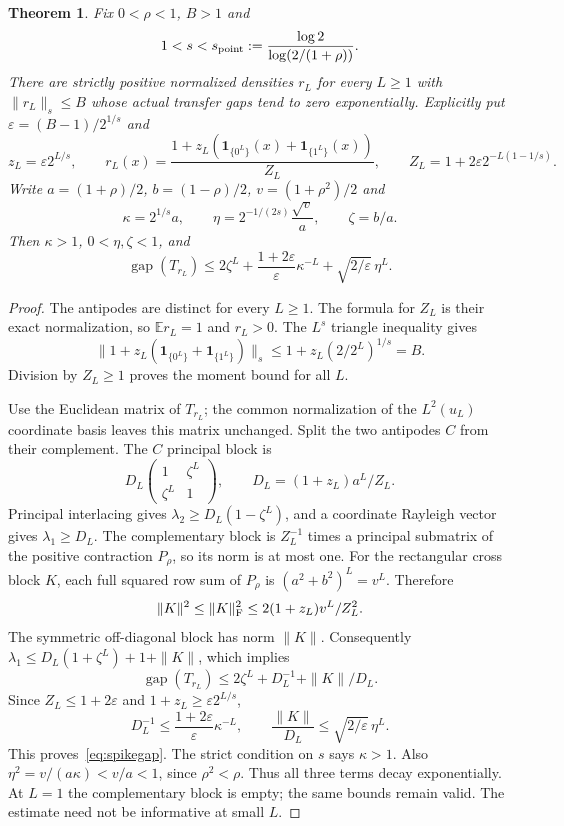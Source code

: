 \documentclass[11pt]{article}
\newtheorem{theorem}{Theorem}
\newcommand{\gap}{\operatorname{gap}}
\begin{document}
\begin{theorem}\label{thm:spikes}
Fix $0<\rho<1$, $B>1$ and
\[
 1<s<s_{\rm point}:=\frac{\log2}{\log(2/(1+\rho))}.
\]
There are strictly positive normalized densities $r_L$ for every $L\ge1$
with $\|r_L\|_s\le B$ whose actual transfer gaps tend to zero
exponentially. Explicitly put $\varepsilon=(B-1)/2^{1/s}$ and
\[
 z_L=\varepsilon2^{L/s},\qquad
 r_L(x)=\frac{1+z_L(\mathbf1_{\{0^L\}}(x)+\mathbf1_{\{1^L\}}(x))}{Z_L},
 \qquad Z_L=1+2\varepsilon2^{-L(1-1/s)}.
\]
Write $a=(1+\rho)/2$, $b=(1-\rho)/2$, $v=(1+\rho^2)/2$ and
\[
 \kappa=2^{1/s}a,\qquad
 \eta=2^{-1/(2s)}\frac{\sqrt v}{a},\qquad \zeta=b/a.
\]
Then $\kappa>1$, $0<\eta,\zeta<1$, and
\begin{equation}\label{eq:spikegap}
 \gap(T_{r_L})\le2\zeta^L+\frac{1+2\varepsilon}{\varepsilon}\kappa^{-L}
                      +\sqrt{2/\varepsilon}\,\eta^L.
\end{equation}
\end{theorem}
\begin{proof}
The antipodes are distinct for every $L\ge1$. The formula for $Z_L$
is their exact normalization, so $\mathbb E r_L=1$ and $r_L>0$.
The $L^s$ triangle inequality gives
\[
 \|1+z_L(\mathbf1_{\{0^L\}}+\mathbf1_{\{1^L\}})\|_s
 \le1+z_L(2/2^L)^{1/s}=B.
\]
Division by $Z_L\ge1$ proves the moment bound for all $L$.

Use the Euclidean matrix of $T_{r_L}$; the common normalization of the
$L^2(u_L)$ coordinate basis leaves this matrix unchanged. Split the two
antipodes $C$ from their complement. The $C$ principal block is
\[
 D_L\begin{pmatrix}1&\zeta^L\\\zeta^L&1\end{pmatrix},
 \qquad D_L=(1+z_L)a^L/Z_L.
\]
Principal interlacing gives $\lambda_2\ge D_L(1-\zeta^L)$, and a
coordinate Rayleigh vector gives $\lambda_1\ge D_L$. The complementary
block is $Z_L^{-1}$ times a principal submatrix of the positive
contraction $P_\rho$, so its norm is at most one. For the rectangular
cross block $K$, each full squared row sum of $P_\rho$ is
$(a^2+b^2)^L=v^L$. Therefore
\[
 \|K\|^2\le\|K\|_{\rm F}^2\le2(1+z_L)v^L/Z_L^2.
\]
The symmetric off-diagonal block has norm $\|K\|$. Consequently
$\lambda_1\le D_L(1+\zeta^L)+1+\|K\|$, which implies
\[
 \gap(T_{r_L})\le2\zeta^L+D_L^{-1}+\|K\|/D_L.
\]
Since $Z_L\le1+2\varepsilon$ and $1+z_L\ge\varepsilon2^{L/s}$,
\[
 D_L^{-1}\le\frac{1+2\varepsilon}{\varepsilon}\kappa^{-L},
 \qquad \frac{\|K\|}{D_L}\le\sqrt{2/\varepsilon}\,\eta^L.
\]
This proves~\eqref{eq:spikegap}. The strict condition on $s$ says
$\kappa>1$. Also $\eta^2=v/(a\kappa)<v/a<1$, since $\rho^2<\rho$.
Thus all three terms decay exponentially. At $L=1$ the complementary
block is empty; the same bounds remain valid. The estimate need not be
informative at small $L$.
\end{proof}
\end{document}
